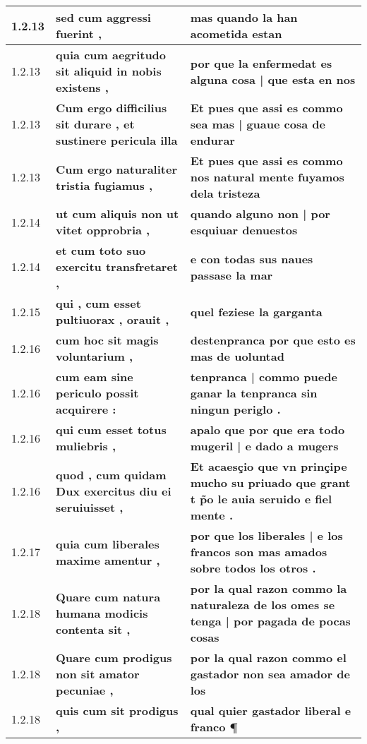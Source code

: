 \begin{tabular}{|p{1cm}|p{6.5cm}|p{6.5cm}|}
1.2.13 &  \textbf{ sed cum aggressi fuerint , }  &  \textbf{ mas quando la han acometida estan }  \\\hline
1.2.13 &  \textbf{ quia cum aegritudo sit aliquid in nobis existens , }  &  \textbf{ por que la enfermedat es alguna cosa | que esta en nos }  \\\hline
1.2.13 &  \textbf{ Cum ergo difficilius sit durare , et sustinere pericula illa }  &  \textbf{ Et pues que assi es commo sea mas | guaue cosa de endurar }  \\\hline
1.2.13 &  \textbf{ Cum ergo naturaliter tristia fugiamus , }  &  \textbf{ Et pues que assi es commo nos natural mente fuyamos dela tristeza }  \\\hline
1.2.14 &  \textbf{ ut cum aliquis non ut vitet opprobria , }  &  \textbf{ quando alguno non | por esquiuar denuestos }  \\\hline
1.2.14 &  \textbf{ et cum toto suo exercitu transfretaret , }  &  \textbf{ e con todas sus naues passase la mar }  \\\hline
1.2.15 &  \textbf{ qui , cum esset pultiuorax , orauit , }  &  \textbf{ quel feziese la garganta }  \\\hline
1.2.16 &  \textbf{ cum hoc sit magis voluntarium , }  &  \textbf{ destenpranca por que esto es mas de uoluntad }  \\\hline
1.2.16 &  \textbf{ cum eam sine periculo possit acquirere : }  &  \textbf{ tenpranca | commo puede ganar la tenpranca sin ningun periglo . }  \\\hline
1.2.16 &  \textbf{ qui cum esset totus muliebris , }  &  \textbf{ apalo que por que era todo mugeril | e dado a mugers }  \\\hline
1.2.16 &  \textbf{ quod , cum quidam Dux exercitus diu ei seruiuisset , }  &  \textbf{ Et acaesçio que vn prinçipe mucho su priuado que grant t p̃o le auia seruido e fiel mente . }  \\\hline
1.2.17 &  \textbf{ quia cum liberales maxime amentur , }  &  \textbf{ por que los liberales | e los francos son mas amados sobre todos los otros . }  \\\hline
1.2.18 &  \textbf{ Quare cum natura humana modicis contenta sit , }  &  \textbf{ por la qual razon commo la naturaleza de los omes se tenga | por pagada de pocas cosas }  \\\hline
1.2.18 &  \textbf{ Quare cum prodigus non sit amator pecuniae , }  &  \textbf{ por la qual razon commo el gastador non sea amador de los }  \\\hline
1.2.18 &  \textbf{ quis cum sit prodigus , }  &  \textbf{ qual quier gastador liberal e franco ¶ }  \\\hline

\end{tabular}
